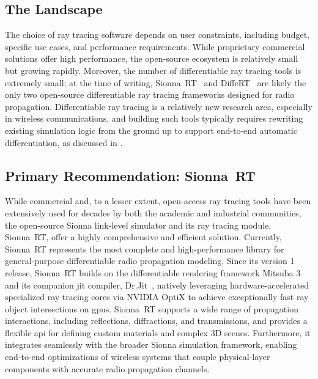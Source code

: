 \subsection{The Landscape}

The choice of ray tracing software depends on user constraints, including budget, specific use cases, and performance requirements. While proprietary commercial solutions offer high performance, the open-source ecosystem is relatively small but growing rapidly. Moreover, the number of differentiable ray tracing tools is extremely small; at the time of writing, Sionna~RT~ and DiffeRT~ are likely the only two open-source differentiable ray tracing frameworks designed for radio propagation. Differentiable ray tracing is a relatively new research area, especially in wireless communications, and building such tools typically requires rewriting existing simulation logic from the ground up to support end-to-end automatic differentiation, as discussed in .

\subsection{Primary Recommendation: Sionna~RT}

While commercial and, to a lesser extent, open-access ray tracing tools have been extensively used for decades by both the academic and industrial communities, the open-source Sionna link-level simulator and its ray tracing module, Sionna~RT, offer a highly comprehensive and efficient solution. Currently, Sionna~RT represents the most complete and high-performance library for general-purpose differentiable radio propagation modeling. Since its version 1 release, Sionna~RT builds on the differentiable rendering framework Mitsuba 3~ and its companion \gls{jit} compiler, Dr.Jit~, natively leveraging hardware-accelerated specialized ray tracing cores via NVIDIA OptiX to achieve exceptionally fast ray--object intersections on \glspl{gpu}. Sionna~RT supports a wide range of propagation interactions, including reflections, diffractions, and transmissions, and provides a flexible \gls{api} for defining custom materials and complex 3D scenes. Furthermore, it integrates seamlessly with the broader Sionna simulation framework, enabling end-to-end optimizations of wireless systems that couple physical-layer components with accurate radio propagation channels.

